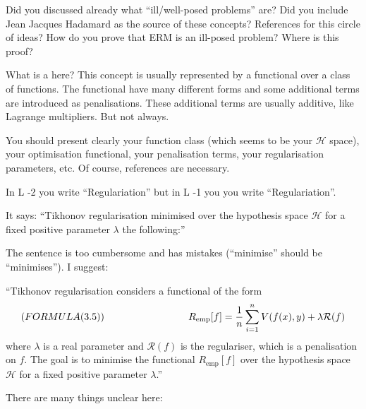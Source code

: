 \begin{description}[style=unboxed,leftmargin=0cm,itemsep=3ex]
Did you discussed already what ``ill/well-posed problems'' are?
Did you include Jean Jacques Hadamard as the source of these concepts?
References for this circle of ideas?
How do you prove that ERM is an ill-posed problem?
Where is this proof?

What is a  here?
This concept is usually represented by a functional over a class of
functions.
The functional have many different forms and some additional terms
are introduced as penalisations.
These additional terms are usually additive, like Lagrange multipliers.
But not always.



You should present clearly your function class (which seems to be your
$\mathcal H$ space), your optimisation functional, your penalisation
terms, your regularisation parameters, etc.
Of course, references are necessary.

In L -2 you write ``Regulariation'' but in L -1 you you write 
``Regulariation''.

It says: ``Tikhonov regularisation minimised over the hypothesis space
$\mathcal H$ for a fixed positive parameter $\lambda$ the following:''

The sentence is too cumbersome and has mistakes (``minimise'' should be
``minimises'').
I suggest:

``Tikhonov regularisation considers a functional of the form
$$
( FORMULA (3.5) ) \rule{3cm}{0pt} R_{\text{emp}}[f] 
= \frac{1}{n} \sum_{i=1}^n V(f(x),y) + \lambda \mathcal{R}(f)
$$
where $\lambda$ is a real parameter and $\mathcal{R}(f)$ is the
regulariser, which is a penalisation on $f$.
The goal is to minimise the functional $R_{\text{emp}}[f]$ over the
hypothesis space $\mathcal H$ for a fixed positive parameter $\lambda$.''

There are many things unclear here:


\end{description}
